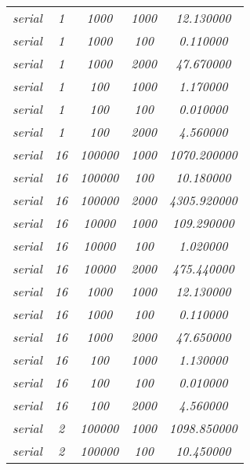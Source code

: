 \documentclass[../main.tex]{subfiles}
\begin{document}
\begin{table}[]
\begin{tabular}{|c|c|c|c|c|}
\textit{serial}  & \textit{1}       & \textit{1000}   & \textit{1000} & \textit{12.130000}   \\
\textit{serial}  & \textit{1}       & \textit{1000}   & \textit{100}  & \textit{0.110000}    \\
\textit{serial}  & \textit{1}       & \textit{1000}   & \textit{2000} & \textit{47.670000}   \\
\textit{serial}  & \textit{1}       & \textit{100}    & \textit{1000} & \textit{1.170000}    \\
\textit{serial}  & \textit{1}       & \textit{100}    & \textit{100}  & \textit{0.010000}    \\
\textit{serial}  & \textit{1}       & \textit{100}    & \textit{2000} & \textit{4.560000}    \\
\textit{serial}  & \textit{16}      & \textit{100000} & \textit{1000} & \textit{1070.200000} \\
\textit{serial}  & \textit{16}      & \textit{100000} & \textit{100}  & \textit{10.180000}   \\
\textit{serial}  & \textit{16}      & \textit{100000} & \textit{2000} & \textit{4305.920000} \\
\textit{serial}  & \textit{16}      & \textit{10000}  & \textit{1000} & \textit{109.290000}  \\
\textit{serial}  & \textit{16}      & \textit{10000}  & \textit{100}  & \textit{1.020000}    \\
\textit{serial}  & \textit{16}      & \textit{10000}  & \textit{2000} & \textit{475.440000}  \\
\textit{serial}  & \textit{16}      & \textit{1000}   & \textit{1000} & \textit{12.130000}   \\
\textit{serial}  & \textit{16}      & \textit{1000}   & \textit{100}  & \textit{0.110000}    \\
\textit{serial}  & \textit{16}      & \textit{1000}   & \textit{2000} & \textit{47.650000}   \\
\textit{serial}  & \textit{16}      & \textit{100}    & \textit{1000} & \textit{1.130000}    \\
\textit{serial}  & \textit{16}      & \textit{100}    & \textit{100}  & \textit{0.010000}    \\
\textit{serial}  & \textit{16}      & \textit{100}    & \textit{2000} & \textit{4.560000}    \\
\textit{serial}  & \textit{2}       & \textit{100000} & \textit{1000} & \textit{1098.850000} \\
\textit{serial}  & \textit{2}       & \textit{100000} & \textit{100}  & \textit{10.450000}   \\

\end{tabular}
\end{table}
\end{document}
